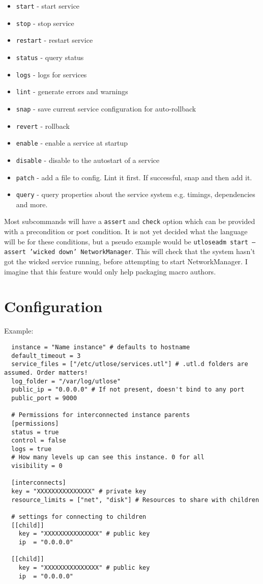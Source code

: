 \documentclass{article}
\begin{document}
\begin{itemize}
  \item \texttt{start} - start service
  \item \texttt{stop} - stop service
  \item \texttt{restart} - restart service
  \item \texttt{status} - query status
  \item \texttt{logs} - logs for services
  \item \texttt{lint} - generate errors and warnings
  \item \texttt{snap} - save current service configuration for auto-rollback
  \item \texttt{revert} - rollback
  \item \texttt{enable} - enable a service at startup
  \item \texttt{disable} - disable to the autostart of a service
  \item \texttt{patch} - add a file to config. Lint it first. If successful, snap and then add it.
  \item \texttt{query} - query properties about the service system e.g. timings, dependencies and more.
\end{itemize}

Most subcommands will have a \texttt{assert} and \texttt{check} option which can be provided with a
precondition or post condition. It is not yet decided what the language will be for these conditions,
but a pseudo example would be \texttt{utloseadm start --assert 'wicked down' NetworkManager}. This
will check that the system hasn't got the wicked service running, before attempting to start NetworkManager.
I imagine that this feature would only help packaging macro authors.

\section{Configuration}
Example:
\begin{verbatim}
  instance = "Name instance" # defaults to hostname
  default_timeout = 3
  service_files = ["/etc/utlose/services.utl"] # .utl.d folders are assumed. Order matters!
  log_folder = "/var/log/utlose"
  public_ip = "0.0.0.0" # If not present, doesn't bind to any port
  public_port = 9000
  
  # Permissions for interconnected instance parents
  [permissions]
  status = true
  control = false
  logs = true
  # How many levels up can see this instance. 0 for all
  visibility = 0 

  [interconnects]
  key = "XXXXXXXXXXXXXXX" # private key
  resource_limits = ["net", "disk"] # Resources to share with children

  # settings for connecting to children
  [[child]]
    key = "XXXXXXXXXXXXXXX" # public key
    ip  = "0.0.0.0"

  [[child]]
    key = "XXXXXXXXXXXXXXX" # public key
    ip  = "0.0.0.0"
\end{verbatim}
\end{document}
